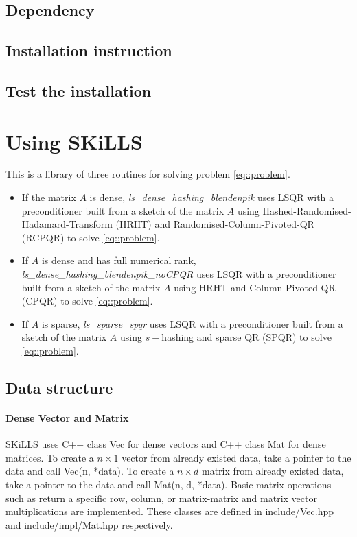 \documentclass[english,11pt]{article}
\begin{document}
\subsection{Dependency}
\subsection{Installation instruction}
\subsection{Test the installation}

\section{Using SKiLLS}

This is a library of three routines for solving problem \eqref{eq::problem}. 

\begin{itemize}
	\item If the matrix $A$ is dense, {\it ls_dense_hashing_blendenpik} uses LSQR with a preconditioner built from a sketch of the matrix $A$ using Hashed-Randomised-Hadamard-Transform (HRHT) and Randomised-Column-Pivoted-QR (RCPQR) to solve \eqref{eq::problem}.

	\item If $A$ is dense and has full numerical rank, {\it ls_dense_hashing_blendenpik_noCPQR} uses LSQR with a preconditioner built from a sketch of the matrix $A$ using HRHT and Column-Pivoted-QR (CPQR) to solve \eqref{eq::problem}.

	\item   If $A$ is sparse, {\it ls_sparse_spqr} uses LSQR with a preconditioner built from a sketch of the matrix $A$ using $s-$hashing and sparse QR (SPQR) to solve \eqref{eq::problem}.
\end{itemize}

\subsection{Data structure}

\paragraph{Dense Vector and Matrix}
SKiLLS uses C++ class Vec for dense vectors and C++ class Mat for dense matrices. 
To create a $n\times 1$ vector from already existed data, take a pointer to the data and call Vec(n, *data). 
To create a $n \times d$ matrix from already existed data, take a pointer to the data and call Mat(n, d, *data). Basic matrix operations such as return a specific row, column, or matrix-matrix and matrix vector multiplications are implemented.  
These classes are defined in include/Vec.hpp and include/impl/Mat.hpp respectively. 
\end{document}
